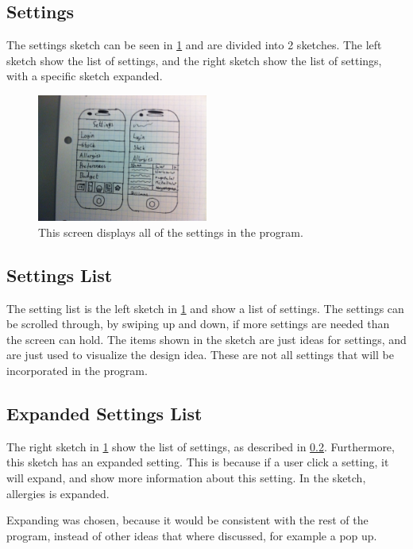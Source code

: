 \subsection{Settings}

The settings sketch can be seen in \cref{SettingsScreen} and are divided into 2 sketches. The left sketch show the list of settings, and the right sketch show the list of settings, with a specific sketch expanded.

\begin{figure}[H]
	\centering
    \includegraphics[width=0.5\textwidth]{Grafik/FoodPlanner/FinalSettingsSketch}
	\caption{This screen displays all of the settings in the program.}
	\label{SettingsScreen}
\end{figure}

\subsection{Settings List} \label{SettingsList}

The setting list is the left sketch in \cref{SettingsScreen} and show a list of settings. The settings can be scrolled through, by swiping up and down, if more settings are needed than the screen can hold. The items shown in the sketch are just ideas for settings, and are just used to visualize the design idea. These are not all settings that will be incorporated in the program.

\subsection{Expanded Settings List}

The right sketch in \cref{SettingsScreen} show the list of settings, as described in \cref{SettingsList}. Furthermore, this sketch has an expanded setting. This is because if a user click a setting,  it will expand, and show more information about this setting. In the sketch, allergies is expanded.

Expanding was chosen, because it would be consistent with the rest of the program, instead of other ideas that where discussed, for example a pop up. 